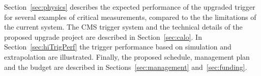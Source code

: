 Section~\ref{sec:physics} describes the expected performance of the upgraded 
trigger for several examples of critical measurements, compared to the the limitations of the current system. 
The CMS trigger system and the technical details of the proposed upgrade project are described in Section~\ref{sec:calo}. 
In Section~\ref{sec:hiTrigPerf} the trigger performance based on simulation and extrapolation are illustrated. Finally, 
the proposed schedule, management plan and the budget are described in Sections~\ref{sec:management} and~\ref{sec:funding}.


